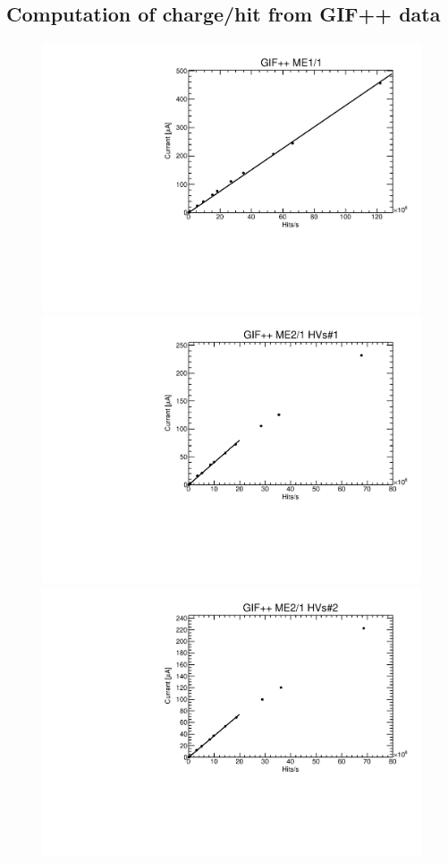 \subsection{Computation of charge/hit from GIF++ data}
\begin{figure}
	\centering
	\includegraphics[width=\halfFigWidth]{figures/neutron/g_ALL_C1.pdf}\hspace*{-1em}
	\includegraphics[width=\halfFigWidth]{figures/neutron/g_S1_C110.pdf}
	\includegraphics[width=\halfFigWidth]{figures/neutron/g_S2_C110.pdf}\hspace*{-1em}

\end{figure}
